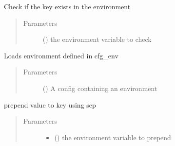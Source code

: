 \documentclass[a4paper,10pt,english]{sphinxmanual}
\begin{document}
\begin{fulllineitems}
\begin{fulllineitems}
\begin{quote}
\begin{description}
\end{description}\end{quote}

\end{fulllineitems}


\begin{fulllineitems}
\label{\detokenize{commands/apidoc/src:src.environment.SalomeEnviron.is_defined}}
Check if the key exists in the environment
\begin{quote}\begin{description}
\item[{Parameters}] \leavevmode
{} () \textendash{} the environment variable to check

\end{description}\end{quote}

\end{fulllineitems}


\begin{fulllineitems}
\label{\detokenize{commands/apidoc/src:src.environment.SalomeEnviron.load_cfg_environment}}
Loads environment defined in cfg\_env
\begin{quote}\begin{description}
\item[{Parameters}] \leavevmode
{} () \textendash{} A config containing an environment

\end{description}\end{quote}

\end{fulllineitems}


\begin{fulllineitems}
\label{\detokenize{commands/apidoc/src:src.environment.SalomeEnviron.prepend}}
prepend value to key using sep
\begin{quote}\begin{description}
\item[{Parameters}] \leavevmode\begin{itemize}
\item {} 
 () \textendash{} the environment variable to prepend


\end{itemize}
\end{description}
\end{quote}
\end{fulllineitems}
\end{fulllineitems}
\end{document}
